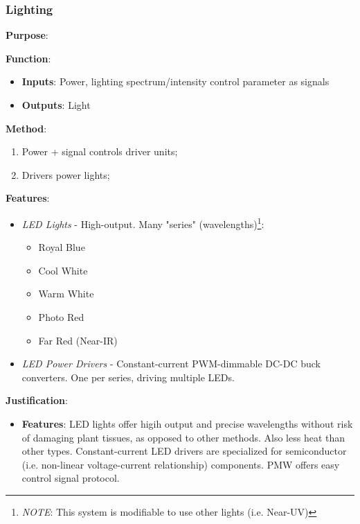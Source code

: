 \documentclass{report}
\begin{document}
\newpage

\subsubsection{Lighting}
\label{sec:lighting}

\textbf{Purpose}:

\textbf{Function}:
\begin{itemize}
    \item \textbf{Inputs}: Power, lighting spectrum/intensity control parameter as signals
    \item \textbf{Outputs}: Light
\end{itemize}

\textbf{Method}:
\begin{enumerate}
    \item Power + signal controls driver units;
    \item Drivers power lights;
\end{enumerate}

\textbf{Features}:
\begin{itemize}
    \item \textit{LED Lights} - High-output. Many "series" (wavelengths)\footnote{\textit{NOTE}: This system is modifiable to use other lights (i.e. Near-UV)}:
    \begin{itemize}
        \item Royal Blue
        \item Cool White
        \item Warm White
        \item Photo Red
        \item Far Red (Near-IR)
    \end{itemize}
    \item \textit{LED Power Drivers} - Constant-current PWM-dimmable DC-DC buck converters. One per series, driving multiple LEDs.
\end{itemize}

\textbf{Justification}:
\begin{itemize}
    \item \textbf{Features}: LED lights offer higih output and precise wavelengths without risk of damaging plant tissues, as opposed to other methods. Also less heat than other types. Constant-current LED drivers are specialized for semiconductor (i.e. non-linear voltage-current relationship) components. PMW offers easy control signal protocol.
\end{itemize}
\end{document}
